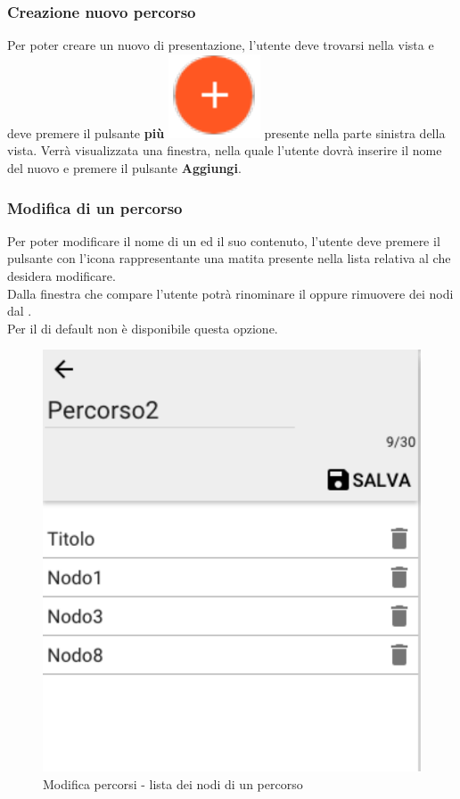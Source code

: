 \subsubsection{Creazione nuovo percorso}
Per poter creare un nuovo  di presentazione, l'utente deve trovarsi nella vista \textit{} e deve premere il pulsante \textbf{più} \includegraphics[scale=0.5]{immagini/piuButton.pdf} presente nella parte sinistra della vista.
Verrà visualizzata una finestra, nella quale l'utente dovrà inserire il nome del nuovo  e premere il pulsante \textbf{Aggiungi}.
\subsubsection{Modifica di un percorso}
Per poter modificare il nome di un  ed il suo contenuto, l'utente deve premere il pulsante con l'icona rappresentante una matita presente nella lista  relativa al  che desidera modificare.\\
Dalla finestra che compare l'utente potrà rinominare il  oppure rimuovere dei nodi dal .\\
Per il  di default non è disponibile questa opzione.
\begin{figure}[H]
\centering
\includegraphics[scale=0.6]{immagini/modificaPercorso.pdf}
\caption{Modifica percorsi - lista dei nodi di un percorso}
\end{figure}
\FloatBarrier
